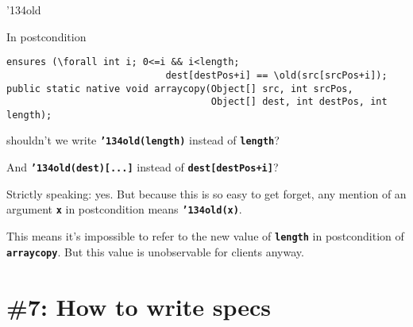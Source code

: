 \documentclass[
pdf,
nocolorBG,
slideColor,
cok,
]{prosper}
\newcommand{\code}[1]{{\rm \texttt{\textbf{\small #1}}}}
\newcommand{\bsl}{\char'134}
\newcommand{\old}{\bsl old}
\begin{document}
\begin{slide}{\old}
\vspace*{-6ex}

In postcondition 
{\tiny
\begin{verbatim} 
ensures (\forall int i; 0<=i && i<length; 
                            dest[destPos+i] == \old(src[srcPos+i]);
public static native void arraycopy(Object[] src, int srcPos,
                                    Object[] dest, int destPos, int length);
\end{verbatim}
}
shouldn't we write \code{\old(length)} instead of \code{length}?

And \code{\old(dest)[...]} instead of \code{dest[destPos+i]}?

\smallskip

Strictly speaking: yes. But because this is so easy to get forget,
{\blue any mention of an argument \code{x} in postcondition means \code{\old(x)}.}

\medskip

{\scriptsize This means it's impossible to refer to the new value of 
\code{length} in postcondition of \code{arraycopy}. But this value is
unobservable for clients anyway.}

\end{slide}


\part{{\Large \red \#7: How to write specs }}


\end{document}
